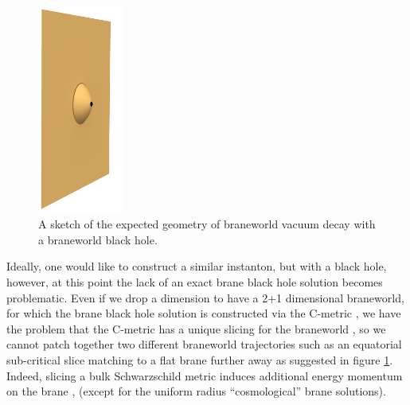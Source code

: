 \documentclass[aps,12pt,prd,superscriptaddress,preprintnumbers, 
	amssymb,
	amsmath,
	notitlepage,
	longbibliography,
	nofootinbib]{revtex4-1}
\begin{document}
\begin{figure}
\centering
\vskip -5mm
\includegraphics[width=0.25\textwidth]{bhcdla.pdf}
\caption{A sketch of the expected geometry of braneworld
vacuum decay with a braneworld black hole.}
\label{fig:bhcdl}
\end{figure}
Ideally, one would like to construct a similar instanton, but with a 
black hole, however, at this point the lack of an exact brane black
hole solution becomes problematic. Even if we drop a dimension
to have a 2+1 dimensional braneworld, for which the brane black
hole solution is constructed via the C-metric \cite{Emparan:1999wa},
we have the problem that the C-metric has a unique slicing for the 
braneworld \cite{Kudoh:2004ub}, so we cannot patch together two 
different braneworld trajectories such as an equatorial sub-critical
slice matching to a flat brane further away as suggested in figure \ref{fig:bhcdl}. 
Indeed, slicing a bulk Schwarzschild metric induces additional energy 
momentum on the brane \cite{Galfard:2005va,Creek:2006je},
(except for the uniform radius ``cosmological'' brane solutions).
\end{document}
